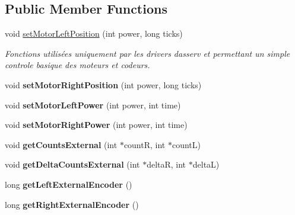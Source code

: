 \subsection*{Public Member Functions}
\begin{DoxyCompactItemize}
\item 
\mbox{\label{classAsservDriver_a49dad05da23fe62aa4bf582199eaa3a6}} 
void \hyperlink{classAsservDriver_a49dad05da23fe62aa4bf582199eaa3a6}{set\+Motor\+Left\+Position} (int power, long ticks)
\begin{DoxyCompactList}\small\item\em Fonctions utilisées uniquement par les drivers d\textquotesingle{}asserv et permettant un simple controle basique des moteurs et codeurs. \end{DoxyCompactList}\item 
\mbox{\label{classAsservDriver_a62a57e92e4933413d9c3c6b62f496ef3}} 
void {\bfseries set\+Motor\+Right\+Position} (int power, long ticks)
\item 
\mbox{\label{classAsservDriver_a3b702233fa09a657bb03372470152376}} 
void {\bfseries set\+Motor\+Left\+Power} (int power, int time)
\item 
\mbox{\label{classAsservDriver_a54e742670bae9a19dc70b982cad4c3ba}} 
void {\bfseries set\+Motor\+Right\+Power} (int power, int time)
\item 
\mbox{\label{classAsservDriver_a20f2e69b261448cac7c4d521e1e845d2}} 
void {\bfseries get\+Counts\+External} (int $\ast$countR, int $\ast$countL)
\item 
\mbox{\label{classAsservDriver_aa74a2ee4e100326d639c733892ff5852}} 
void {\bfseries get\+Delta\+Counts\+External} (int $\ast$deltaR, int $\ast$deltaL)
\item 
\mbox{\label{classAsservDriver_aa6924c9da7428d59fa712c15221dfbac}} 
long {\bfseries get\+Left\+External\+Encoder} ()
\item 
\mbox{\label{classAsservDriver_afda042c513d96188f8572899679cc616}} 
long {\bfseries get\+Right\+External\+Encoder} ()
\item 

\end{DoxyCompactItemize}
